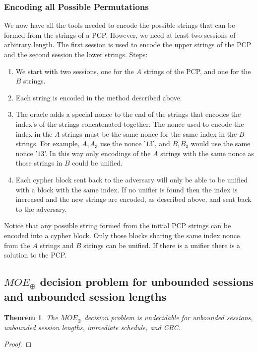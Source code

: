 \documentclass[11pt,twoside,a4paper]{article}
\newtheorem{theorem}{Theorem}
\begin{document}
{\subsubsection{Encoding all Possible Permutations}
We now have all the tools needed to encode the possible 
strings that can be formed from the strings of a PCP. 
However, we need at least two sessions of arbitrary length.
The first session is used to encode the upper strings of the 
PCP and the second session the lower strings. 
Steps:
\begin{enumerate}
	\item We start with two sessions, one for the 
	$A$ strings of the PCP, and one for the $B$ strings.
	\item Each string is encoded in the method described above.
	\item The oracle adds a special 
	nonce to the end of the strings that encodes the index's of the strings concatenated together. The nonce used 
	to encode the index in the $A$ strings must be the same nonce
	for the same index in the $B$ strings. For example, 
	$A_1A_3$ use the nonce '$13$', and $B_1B_3$ would use the same
	nonce '$13$'. In this way only encodings of the $A$ strings with the same nonce as those strings in $B$ could be unified.
	\item Each cypher block sent back to the adversary will only be able to be unified with a block with the same index. 
	If no unifier is found then the index is increased and the 
	new strings are encoded, as described above, and sent back to
	the adversary.  
\end{enumerate}

Notice that any possible string formed from the initial PCP strings 
can be encoded into a cypher block. Only those blocks sharing the
same index nonce from the $A$ strings and $B$ strings can be unified.
If there is a unifier there is a solution to the PCP. 


\subsection{$MOE_{\oplus}$ decision problem for unbounded 
	sessions and unbounded session lengths}
\begin{theorem}\label{thm:unbounded_unbounded}
	The $MOE_{\oplus}$ decision problem is undecidable for unbounded 
	sessions, unbounded session lengths, immediate schedule, and CBC. 
\end{theorem}
\begin{proof}
\end{proof}

}
\end{document}
